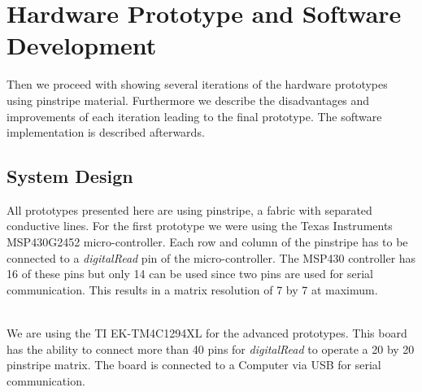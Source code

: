 %
\chapter{Hardware Prototype and Software Development}
\label{Hardware Prototype and Software Development} 
Then we proceed with showing several iterations of the hardware prototypes using pinstripe material. Furthermore we describe the disadvantages and improvements of each iteration leading to the final prototype. The software implementation is described afterwards.

\section{System Design}
All prototypes presented here are using pinstripe, a fabric with separated conductive lines. For the first prototype we were using the Texas Instruments MSP430G2452 micro-controller. Each row and column of the pinstripe has to be connected to a \emph{digitalRead} pin of the micro-controller. The MSP430 controller has 16 of these pins but only 14 can be used since two pins are used for serial communication. This results in a matrix resolution of 7 by 7 at maximum. 
\\ \\

We are using the TI EK-TM4C1294XL for the advanced prototypes. This board has the ability to connect more than 40 pins for \emph{digitalRead} to operate a 20 by 20 pinstripe matrix. The board is connected to a Computer via USB for serial communication.\\

